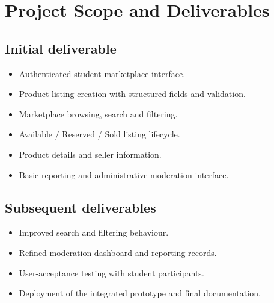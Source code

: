 \documentclass[11pt,a4paper]{article}
\begin{document}

\section{Project Scope and Deliverables}

\subsection{Initial deliverable}

\begin{itemize}

    \item Authenticated student marketplace interface.

    \item Product listing creation with structured fields and
    validation.

    \item Marketplace browsing, search and filtering.

    \item Available / Reserved / Sold listing lifecycle.

    \item Product details and seller information.

    \item Basic reporting and administrative moderation interface.

\end{itemize}

\subsection{Subsequent deliverables}

\begin{itemize}

    \item Improved search and filtering behaviour.

    \item Refined moderation dashboard and reporting records.

    \item User-acceptance testing with student participants.

    \item Deployment of the integrated prototype and final
    documentation.

\end{itemize}
\end{document}
